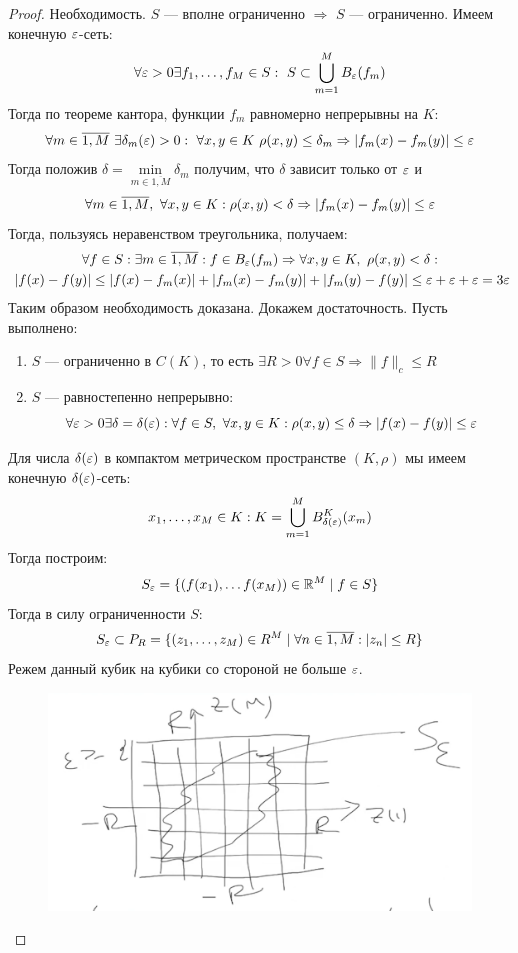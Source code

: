 \begin{proof}
	Необходимость. $S$ --- вполне ограниченно $\Rightarrow$ $S$ --- ограниченно. Имеем конечную $\varepsilon$-сеть:
	$$
	\forall \varepsilon > 0 \exists f_1, \dots, f_M \in S: \ S \subset \bigcup_{m = 1}^M B_\varepsilon(f_m)
	$$
	Тогда по теореме кантора, функции $f_m$ равномерно непрерывны на $K$:
	$$
	\forall m \in \overline{1, M} \ \exists \delta_m(\varepsilon) > 0 : \ \forall x,y \in K \ \rho(x,y) \leq \delta_m \Rightarrow |f_m(x) - f_m(y)| \leq \varepsilon 
	$$
	Тогда положив $\delta = \min\limits_{m \in \overline{1, M}} \delta_m$ получим, что $\delta$ зависит только от $\varepsilon$ и 
	$$
	\forall m \in \overline{1, M}, \ \forall x,y \in K:  \rho(x,y) < \delta \Rightarrow |f_m(x) - f_m(y)| \leq \varepsilon 
	$$
	Тогда, пользуясь неравенством треугольника, получаем:
	$$
	\begin{gathered}
		\forall f \in S: \exists m \in \overline{1, M}: f \in B_\eps(f_m) \Rightarrow \forall x,y \in K, \ \rho(x,y) < \delta: \\ \ |f(x) - f(y)| \leq |f(x) - f_m(x)| + |f_m(x) - f_m(y)| + |f_m(y) - f(y)| \leq \eps + \eps + \eps = 3\eps
	\end{gathered}
	$$
	Таким образом необходимость доказана. Докажем достаточность. Пусть выполнено:
	\begin{enumerate}
		\item $S$ --- ограниченно в $C(K)$, то есть $\exists R > 0 \forall f \in S \Rightarrow \|f\|_c \leq R$
		\item $S$ --- равностепенно непрерывно: 
		$$
		\forall \varepsilon > 0 \exists \delta = \delta(\varepsilon): \forall f \in S, \ \forall x, y \in K : \rho(x,y) \leq \delta \Rightarrow |f(x) - f(y)| \leq \varepsilon 
		$$
	\end{enumerate}
	Для числа $\delta(\varepsilon)$ в компактом метрическом пространстве $(K, \rho)$ мы имеем конечную $\delta(\varepsilon)$-сеть:
	$$
	x_1, \dots, x_M \in K: K = \bigcup_{m=1}^M B^K_{\delta(\varepsilon)}(x_m) 
	$$
	Тогда построим:
	$$
	S_\varepsilon = \{(f(x_1), \dots f(x_M)) \in \mathbb{R}^M \mid f \in S\}
	$$
	Тогда в силу ограниченности $S$:
	$$
	S_\varepsilon \subset P_R = \{(z_1, \dots, z_M) \in R^M \mid \forall n \in \overline{1, M}: |z_n| \leq R \}
	$$
	Режем данный кубик на кубики со стороной не больше $\varepsilon$.
	\begin{figure}[h!]
		\centering
		\includegraphics[width=0.7\linewidth]{pic/screenshot001}
		\caption{}
		\label{fig:screenshot001}
	\end{figure}


\end{proof}

